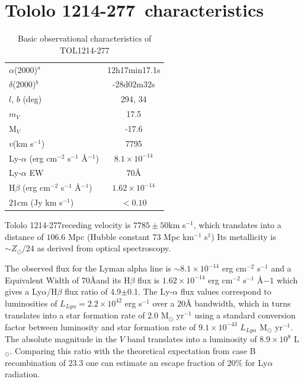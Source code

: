 \documentclass[a4paper, usenatbib, 12pt]{article}
\newcommand{\tol}{Tololo 1214-277}
\begin{document}
{{}


\newpage 

\section*{\tol\ characteristics}


\begin{table}
\begin{center}
\begin{tabular}{lc}
$\alpha$(2000)$^{a}$ & 12h17min17.1s\\
$\delta$(2000)$^{b}$ & -28d02m32s\\
$l$, $b$ (deg) & 294, 34\\
$m_V$ & 17.5\\
  M$_V$ & -17.6\\ 
$v$(km s$^{-1}$) & 7795\\
Ly-$\alpha$ (erg cm$^{-2}$ s$^{-1}$ \AA$^{-1}$)& $8.1\times 10^{-14}$ \\
Ly-$\alpha$ EW & $70$\AA\\
H$\beta$ (erg cm$^{-2}$ s$^{-1}$ \AA$^{-1}$) & $1.62\times 10^{-14}$ \\
$21$cm (Jy km s$^{-1}$)& $<0.10$ \\
\end{tabular}
\end{center}
\caption{Basic observational characteristics of TOL1214-277
  \cite{Thuan97}\\} 
\end{table}



\tol receding velocity is $7785\pm 50$km s$^{-1}$, which translates
into a distance of $106.6$ Mpc (Hubble constant 73 Mpc km$^{-1}$
s$^{1}$)
Its metallicity is $\sim Z_{\odot}/24$ \cite{Izotov04} as derived from optical
spectroscopy. 


The observed flux for the Lyman alpha line is $\sim
8.1\times 10^{-14}$ erg cm$^{-2}$ s$^{-1}$ \cite{Thuan97}
and a Equivalent Width of $70$\AA and its H$\beta$ flux is 
$1.62\times 10^{-14}$ erg cm$^{-2}$ s$^{-1}$ \AA${-1}$
\cite{Izotov04} which gives a Ly$\alpha$/H$\beta$ flux ratio of
4.9$\pm$0.1. The Ly-$\alpha$ flux values correspond to luminosities of
$L_{Ly\alpha}=2.2\times 10^{42}$ erg s$^{-1}$ over a $20$\AA
bandwidth, which in turns translates  into a star formation rate of
$2.0$ M$_{\odot}$ yr$^{-1}$ using a standard conversion factor between
luminosity and star formation rate of $9.1\times 10^{-43}$
$L_{Ly\alpha}$ M$_{\odot}$ yr$^{-1}$. 
The absolute magnitude in the $V$ band translates into a luminosity of
$8.9\times 10^{8}$ L$_{\odot}$.
Comparing this ratio with the theoretical expectation from case B
recombination of $23.3$ \cite{Hummer1987} one can estimate an escape
fraction of $20$\% for Ly$\alpha$ radiation.

}
\end{document}
